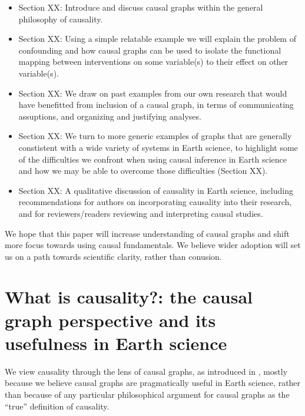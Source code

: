 \documentclass[12pt]{article}
\begin{document}
\begin{itemize}
\item Section XX: Introduce and discuss causal graphs within the
  general philosophy of causality.
\item Section XX: Using a simple relatable example we will explain
  the problem of confounding and how causal graphs can be used to
  isolate the functional mapping between interventions on some
  variable(s) to their effect on other variable(s).
\item Section XX: We draw on past examples from our own research that
  would have benefitted from inclusion of a causal graph, in terms of
  communicating assuptions, and organizing and justifying analyses.
\item Section XX: We turn to more generic examples of graphs that are
  generally constistent with a wide variety of systems in Earth
  science, to highlight some of the difficulties we confront when
  using causal inference in Earth science and how we may be able to
  overcome those difficulties (Section XX).
\item Section XX: A qualitative discussion of causality in Earth
  science, including recommendations for authors on incorporating
  causality into their research, and for reviewers/readers reviewing
  and interpreting causal studies.
\end{itemize}

We hope that this paper will increase understanding of causal graphs
and shift more focus towards using causal fundamentals. We believe
wider adoption will set us on a path towards scientific clarity,
rather than conusion.

\section{What is causality?: the causal graph perspective and its
  usefulness in Earth science}

We view causality through the lens of causal graphs, as introduced in
\citet{pearl1995causal}, mostly because we believe causal graphs are
pragmatically useful in Earth science, rather than because of any
particular philosophical argument for causal graphs as the ``true''
definition of causality.
\end{document}
